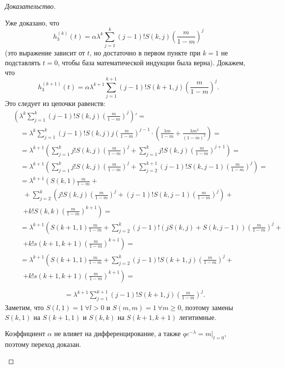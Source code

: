 \documentclass[12pt, specialist, subf, substylefile = spbu.rtx]{disser}
\begin{document}
\begin{proof}[Доказательство]
\begin{enumerate}
			Уже доказано, что
			\[
				h _3 ^{(k)} (t) = \alpha \lambda ^k \sum \limits _{j = 1} ^{k} (j - 1)! S(k, j) \left(\frac m {1 - m}\right) ^j
			\]
			(это выражение зависит от $t$, но достаточно в первом пункте при $k = 1$ не подставлять $t = 0$, чтобы база математической индукции была верна). Докажем, что
			\[
				h _3 ^{(k + 1)} (t) = \alpha \lambda ^{k + 1} \sum \limits _{j = 1} ^{k + 1} (j - 1)! S(k + 1, j) \left(\frac m {1 - m}\right) ^j.
			\]
			Это следует из цепочки равенств:
			\[
				\begin{aligned}
					&\left(\lambda ^k \sum \limits _{j = 1} ^{k} (j - 1)! S(k, j) \left(\frac m {1 - m}\right) ^j\right)' =\\
					&\quad= \lambda ^k \sum \limits _{j = 1} ^{k} (j - 1)! S(k, j) j \left(\frac m {1 - m}\right) ^{j - 1} \cdot \left(\frac {\lambda m} {1 - m} + \frac {\lambda m ^2} {(1 - m) ^2}\right) =\\
					&\quad= \lambda ^{k + 1} \left(\sum \limits _{j = 1} ^{k} j! S(k, j) \left(\frac m {1 - m}\right) ^j + \sum \limits _{j = 1} ^{k} j! S(k, j) \left(\frac m {1 - m}\right) ^{j + 1}\right) =\\
					&\quad= \lambda ^{k + 1} \left(\sum \limits _{j = 1} ^{k} j! S(k, j) \left(\frac m {1 - m}\right) ^j + \sum \limits _{j = 2} ^{k + 1} (j - 1)! S(k, j - 1) \left(\frac m {1 - m}\right) ^j\right) =\\
					&\quad= \lambda ^{k + 1} \left(S(k, 1) \frac m {1 - m} +\right.\\
					&\quad~~ + \sum \limits _{j = 2} ^{k} \left(j! S(k, j) \left(\frac m {1 - m}\right) ^j + (j - 1)! S(k, j - 1) \left(\frac m {1 - m}\right) ^j\right) +\\
					&\quad~~ \left.+ k ! S (k, k) \left(\frac m {1 - m}\right) ^{k + 1}\right) =\\
					&\quad= \lambda ^{k + 1} \left(S(k + 1, 1) \frac m {1 - m} + \sum \limits _{j = 2} ^{k} (j - 1)! \left(j S(k, j) + S(k, j - 1)\right) \left(\frac m {1 - m}\right) ^j +\right.\\
					&\quad~~\left.+ k ! s (k + 1, k + 1) \left(\frac m {1 - m}\right) ^{k + 1}\right) =\\
					&\quad= \lambda ^{k + 1} \left(S(k + 1, 1) \frac m {1 - m} + \sum \limits _{j = 2} ^{k} (j - 1)! S(k + 1, j) \left(\frac m {1 - m}\right) ^j +\right.\\
					&\quad~~\left.+ k ! s (k + 1, k + 1) \left(\frac m {1 - m}\right) ^{k + 1}\right) =\\
				\end{aligned}
			\]
			\[
				\begin{aligned}
					&\quad=\lambda ^{k + 1} \sum \limits _{j = 1} ^{k + 1} (j - 1)! S(k + 1, j) \left(\frac m {1 - m}\right) ^j.
				\end{aligned}
			\]
			Заметим, что $S(l, 1) = 1~ \forall l > 0$ и $S(m, m) = 1~ \forall m \geqslant 0$, поэтому замены $S(k, 1)$ на $S(k + 1, 1)$ и $S(k, k)$ на $S(k + 1, k + 1)$ легитимные.
			
			Коэффициент $\alpha$ не влияет на дифференцирование, а также $q e ^{-\lambda} = m | _{t = 0}$, поэтому переход доказан.
		\end{enumerate}
	\end{proof}
\end{document}
